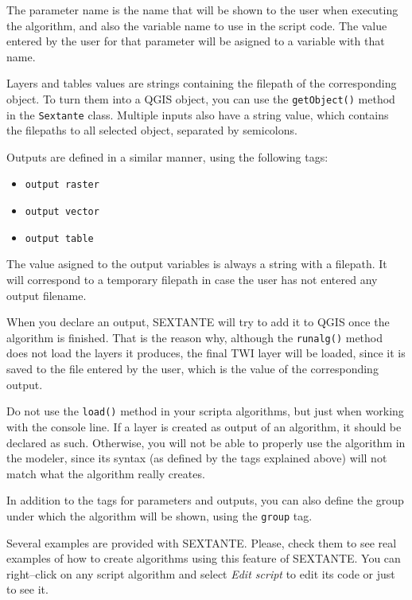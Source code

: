 The parameter name is the name that will be shown to the user when executing the algorithm, and also the variable name to use in the script code. The value entered by the user for that parameter will be asigned to a variable with that name.

Layers and tables values are strings containing the filepath of the corresponding object. To turn them into a QGIS object, you can use the \texttt{getObject()} method in the \texttt{Sextante} class. Multiple inputs also have a string value, which contains the filepaths to all selected object, separated by semicolons.

Outputs are defined in a similar manner, using the following tags:

\begin{itemize}
	\item \texttt{output raster}
	\item \texttt{output vector}
	\item \texttt{output table}
\end{itemize}

The value asigned to the output variables is always a string with a filepath. It will correspond to a temporary filepath in case the user has not entered any output filename.

When you declare an output, SEXTANTE will try to add it to QGIS once the algorithm is finished. That is the reason why, although the \texttt{runalg()} method does not load the layers it produces, the final TWI layer will be loaded, since it is saved to the file entered by the user, which is the value of the corresponding output.

Do not use the \texttt{load()} method in your scripta algorithms, but just when working with the console line. If a layer is created as output of an algorithm, it should be declared as such. Otherwise, you will not be able to properly use the algorithm in the modeler, since its syntax (as defined by the tags explained above) will not match what the algorithm really creates.

In addition to the tags for parameters and outputs, you can also define the group under which the algorithm will be shown, using the \texttt{group} tag.

Several examples are provided with SEXTANTE. Please, check them to see real examples of how to create algorithms using this feature of SEXTANTE. You can right--click 	on any script algorithm and select \emph{Edit script} to edit its code or just to see it.